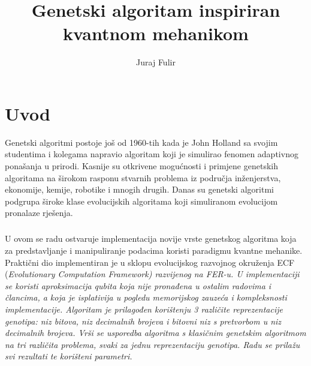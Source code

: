 \documentclass[times, utf8, zavrsni, numeric]{fer}
\begin{document}
\title{Genetski algoritam inspiriran kvantnom mehanikom}
\author{Juraj Fulir}

\maketitle

\izvornik


\tableofcontents

\chapter{Uvod}
Genetski algoritmi postoje još od 1960-tih kada je John Holland sa svojim studentima i kolegama napravio algoritam koji je simulirao fenomen adaptivnog ponašanja u prirodi. Kasnije su otkrivene mogućnosti i primjene genetskih algoritama na širokom rasponu stvarnih problema iz područja inženjerstva, ekonomije, kemije, robotike i mnogih drugih. Danas su genetski algoritmi podgrupa široke klase evolucijskih algoritama koji simuliranom evolucijom pronalaze rješenja. \citep{c_history}

\paragraph{}
U ovom se radu ostvaruje implementacija novije vrste genetskog algoritma koja za predstavljanje i manipuliranje podacima koristi paradigmu kvantne mehanike. Praktični dio implementiran je u sklopu evolucijskog razvojnog okruženja ECF (\it Evolutionary Computation Framework\rm) razvijenog na FER-u. U implementaciji se koristi aproksimacija qubita koja nije pronađena u ostalim radovima i člancima, a koja je isplativija u pogledu memorijskog zauzeća i kompleksnosti implementacije. Algoritam je prilagođen korištenju 3 različite reprezentacije genotipa: niz bitova, niz decimalnih brojeva i bitovni niz s pretvorbom u niz decimalnih brojeva. Vrši se usporedba algoritma s klasičnim genetskim algoritmom na tri različita problema, svaki za jednu reprezentaciju genotipa. Radu se prilažu svi rezultati te korišteni parametri. 
\end{document}
